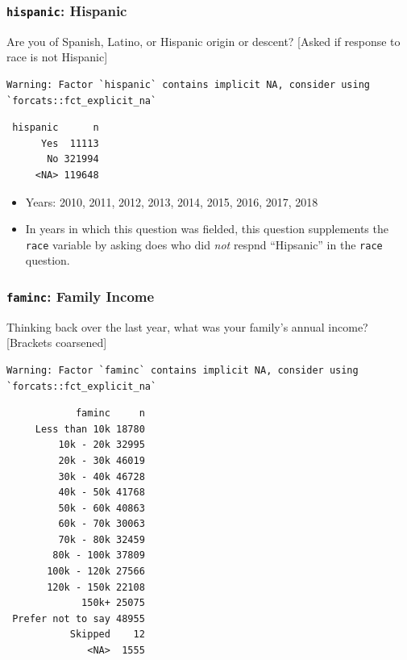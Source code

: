 \documentclass[10pt,article,oneside]{memoir}
\theoremstyle{definition}
\begin{document}
\hypertarget{hispanic-hispanic}{%
\subsubsection{\texorpdfstring{\texttt{hispanic}:
Hispanic}{hispanic: Hispanic}}\label{hispanic-hispanic}}

Are you of Spanish, Latino, or Hispanic origin or descent? {[}Asked if
response to race is not Hispanic{]}

\begin{verbatim}
Warning: Factor `hispanic` contains implicit NA, consider using
`forcats::fct_explicit_na`
\end{verbatim}

\begin{verbatim}
 hispanic      n
      Yes  11113
       No 321994
     <NA> 119648
\end{verbatim}

\begin{itemize}
\tightlist
\item
  Years: 2010, 2011, 2012, 2013, 2014, 2015, 2016, 2017, 2018
\item
  In years in which this question was fielded, this question supplements
  the \texttt{race} variable by asking does who did \emph{not} respnd
  ``Hipsanic'' in the \texttt{race} question.
\end{itemize}

\hypertarget{faminc-family-income}{%
\subsubsection{\texorpdfstring{\texttt{faminc}: Family
Income}{faminc: Family Income}}\label{faminc-family-income}}

Thinking back over the last year, what was your family's annual income?
{[}Brackets coarsened{]}

\begin{verbatim}
Warning: Factor `faminc` contains implicit NA, consider using
`forcats::fct_explicit_na`
\end{verbatim}

\begin{verbatim}
            faminc     n
     Less than 10k 18780
         10k - 20k 32995
         20k - 30k 46019
         30k - 40k 46728
         40k - 50k 41768
         50k - 60k 40863
         60k - 70k 30063
         70k - 80k 32459
        80k - 100k 37809
       100k - 120k 27566
       120k - 150k 22108
             150k+ 25075
 Prefer not to say 48955
           Skipped    12
              <NA>  1555
\end{verbatim}
\end{document}
